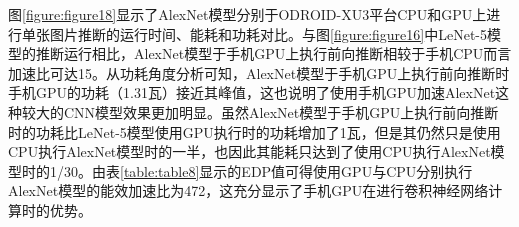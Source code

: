 \begin{table}[htbp]
  \centering
  \caption{AlexNet模型结构中的卷积层和全连接层}
  \label{table:table7}
\end{table}

图\ref{figure:figure18}显示了AlexNet模型分别于ODROID-XU3平台CPU和GPU上进行单张图片推断的运行时间、能耗和功耗对比。与图\ref{figure:figure16}中LeNet-5模型的推断运行相比，AlexNet模型于手机GPU上执行前向推断相较于手机CPU而言加速比可达15。从功耗角度分析可知，AlexNet模型于手机GPU上执行前向推断时手机GPU的功耗（1.31瓦）接近其峰值，这也说明了使用手机GPU加速AlexNet这种较大的CNN模型效果更加明显。虽然AlexNet模型于手机GPU上执行前向推断时的功耗比LeNet-5模型使用GPU执行时的功耗增加了1瓦，但是其仍然只是使用CPU执行AlexNet模型时的一半，也因此其能耗只达到了使用CPU执行AlexNet模型时的1/30。由表\ref{table:table8}显示的EDP值可得使用GPU与CPU分别执行AlexNet模型的能效加速比为472，这充分显示了手机GPU在进行卷积神经网络计算时的优势。

